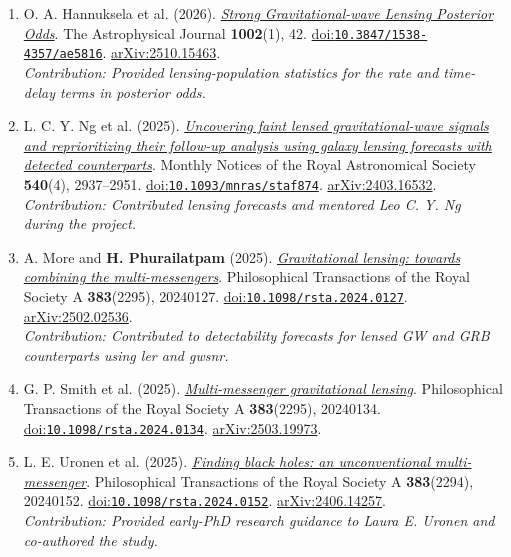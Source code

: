 \documentclass[11pt]{article}
\begin{document}
\begin{enumerate}
\item O. A. Hannuksela et al. (2026). \href{https://doi.org/10.3847/1538-4357/ae5816}{\textit{Strong Gravitational-wave Lensing Posterior Odds}}. The Astrophysical Journal \textbf{1002}(1), 42. \href{https://doi.org/10.3847/1538-4357/ae5816}{doi:\nolinkurl{10.3847/1538-4357/ae5816}}. \href{https://arxiv.org/abs/2510.15463}{arXiv:2510.15463}.\\\emph{Contribution: Provided lensing-population statistics for the rate and time-delay terms in posterior odds.}
\item L. C. Y. Ng et al. (2025). \href{https://doi.org/10.1093/mnras/staf874}{\textit{Uncovering faint lensed gravitational-wave signals and reprioritizing their follow-up analysis using galaxy lensing forecasts with detected counterparts}}. Monthly Notices of the Royal Astronomical Society \textbf{540}(4), 2937--2951. \href{https://doi.org/10.1093/mnras/staf874}{doi:\nolinkurl{10.1093/mnras/staf874}}. \href{https://arxiv.org/abs/2403.16532}{arXiv:2403.16532}.\\\emph{Contribution: Contributed lensing forecasts and mentored Leo C. Y. Ng during the project.}
\item A. More and \textbf{H. Phurailatpam} (2025). \href{https://doi.org/10.1098/rsta.2024.0127}{\textit{Gravitational lensing: towards combining the multi-messengers}}. Philosophical Transactions of the Royal Society A \textbf{383}(2295), 20240127. \href{https://doi.org/10.1098/rsta.2024.0127}{doi:\nolinkurl{10.1098/rsta.2024.0127}}. \href{https://arxiv.org/abs/2502.02536}{arXiv:2502.02536}.\\\emph{Contribution: Contributed to detectability forecasts for lensed GW and GRB counterparts using ler and gwsnr.}
\item G. P. Smith et al. (2025). \href{https://doi.org/10.1098/rsta.2024.0134}{\textit{Multi-messenger gravitational lensing}}. Philosophical Transactions of the Royal Society A \textbf{383}(2295), 20240134. \href{https://doi.org/10.1098/rsta.2024.0134}{doi:\nolinkurl{10.1098/rsta.2024.0134}}. \href{https://arxiv.org/abs/2503.19973}{arXiv:2503.19973}.
\item L. E. Uronen et al. (2025). \href{https://doi.org/10.1098/rsta.2024.0152}{\textit{Finding black holes: an unconventional multi-messenger}}. Philosophical Transactions of the Royal Society A \textbf{383}(2294), 20240152. \href{https://doi.org/10.1098/rsta.2024.0152}{doi:\nolinkurl{10.1098/rsta.2024.0152}}. \href{https://arxiv.org/abs/2406.14257}{arXiv:2406.14257}.\\\emph{Contribution: Provided early-PhD research guidance to Laura E. Uronen and co-authored the study.}

\end{enumerate}
\end{document}
